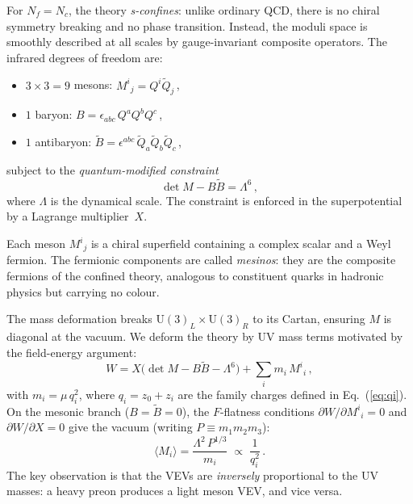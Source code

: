 \documentclass[preprint,12pt]{elsarticle}
\newcommand{\UU}{\mathrm{U}}
\newcommand{\Nf}{N_{\!f}}
\newcommand{\Nc}{N_{\!c}}
\begin{document}
For $\Nf = \Nc$, the theory \emph{s-confines}:
unlike ordinary QCD, there is no chiral symmetry
breaking and no phase transition.
Instead, the moduli space is smoothly described
at all scales by gauge-invariant composite operators.
The infrared degrees of freedom are:
\begin{itemize}
\item $3 \times 3 = 9$ mesons: $M^i{}_j = Q^i\tilde{Q}_j$\,,
\item $1$ baryon: $B = \epsilon_{abc}\,Q^a Q^b Q^c$\,,
\item $1$ antibaryon: $\tilde{B} = \epsilon^{abc}\,
  \tilde{Q}_a\tilde{Q}_b\tilde{Q}_c$\,,
\end{itemize}
subject to the \emph{quantum-modified constraint}
\begin{equation}
  \det M - B\tilde{B} = \Lambda^6\,,
  \label{eq:constraint}
\end{equation}
where $\Lambda$ is the dynamical scale.
The constraint is enforced in the superpotential
by a Lagrange multiplier~$X$.

Each meson $M^i{}_j$ is a chiral superfield
containing a complex scalar and a Weyl fermion.
The fermionic components are called \emph{mesinos}:
they are the composite fermions of the confined theory,
analogous to constituent quarks in hadronic physics
but carrying no colour.

The mass deformation breaks $\UU(3)_L \times \UU(3)_R$
to its Cartan, ensuring $M$ is diagonal at the vacuum.
We deform the theory by UV mass terms motivated
by the field-energy argument:
\begin{equation}
  W = X\bigl(\det M - B\tilde{B} - \Lambda^6\bigr)
    + \sum_i m_i\,M^i{}_i\,,
  \label{eq:W}
\end{equation}
with $m_i = \mu\,q_i^2$, where $q_i = z_0 + z_i$ are
the family charges defined in Eq.~(\ref{eq:qi}).
On the mesonic branch ($B = \tilde{B} = 0$),
the $F$-flatness conditions
$\partial W/\partial M^i{}_i = 0$ and
$\partial W/\partial X = 0$ give the vacuum
(writing $P \equiv m_1 m_2 m_3$):
\begin{equation}
  \langle M_i \rangle = \frac{\Lambda^2\,P^{1/3}}{m_i}
  \;\propto\; \frac{1}{q_i^2}\,.
  \label{eq:Mvev}
\end{equation}
The key observation is that the VEVs are \emph{inversely}
proportional to the UV masses:
a heavy preon produces a light meson VEV, and vice versa.
\end{document}
